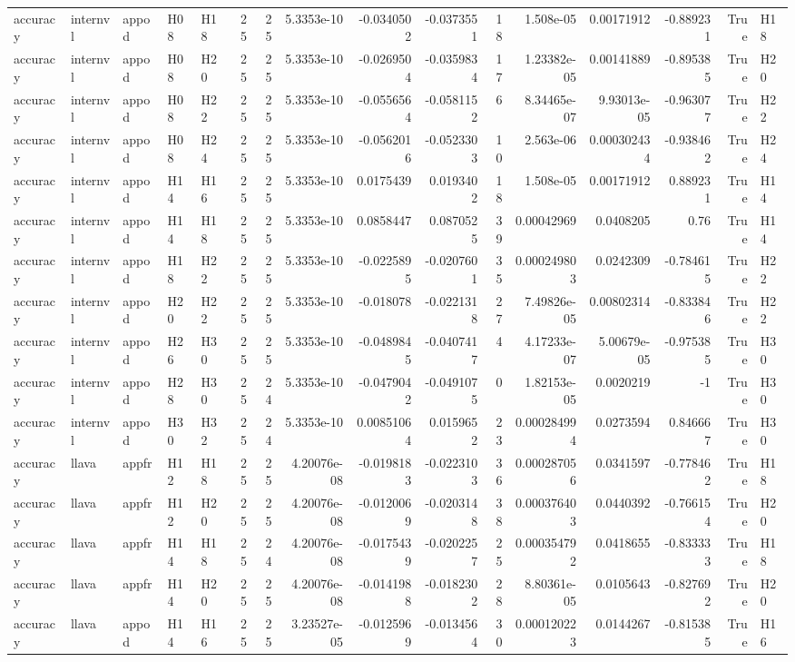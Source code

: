 \begin{longtable}{lllllrrrrrrrrrrl}
accuracy & internvl & appod & H08 & H18 & 25 & 25 & 5.3353e-10 & -0.0340502 & -0.0373551 & 18 & 1.508e-05 & 0.00171912 & -0.889231 & True & H18 \\
accuracy & internvl & appod & H08 & H20 & 25 & 25 & 5.3353e-10 & -0.0269504 & -0.0359834 & 17 & 1.23382e-05 & 0.00141889 & -0.895385 & True & H20 \\
accuracy & internvl & appod & H08 & H22 & 25 & 25 & 5.3353e-10 & -0.0556564 & -0.0581152 & 6 & 8.34465e-07 & 9.93013e-05 & -0.963077 & True & H22 \\
accuracy & internvl & appod & H08 & H24 & 25 & 25 & 5.3353e-10 & -0.0562016 & -0.0523303 & 10 & 2.563e-06 & 0.000302434 & -0.938462 & True & H24 \\
accuracy & internvl & appod & H14 & H16 & 25 & 25 & 5.3353e-10 & 0.0175439 & 0.0193402 & 18 & 1.508e-05 & 0.00171912 & 0.889231 & True & H14 \\
accuracy & internvl & appod & H14 & H18 & 25 & 25 & 5.3353e-10 & 0.0858447 & 0.0870525 & 39 & 0.00042969 & 0.0408205 & 0.76 & True & H14 \\
accuracy & internvl & appod & H18 & H22 & 25 & 25 & 5.3353e-10 & -0.0225895 & -0.0207601 & 35 & 0.000249803 & 0.0242309 & -0.784615 & True & H22 \\
accuracy & internvl & appod & H20 & H22 & 25 & 25 & 5.3353e-10 & -0.018078 & -0.0221318 & 27 & 7.49826e-05 & 0.00802314 & -0.833846 & True & H22 \\
accuracy & internvl & appod & H26 & H30 & 25 & 25 & 5.3353e-10 & -0.0489845 & -0.0407417 & 4 & 4.17233e-07 & 5.00679e-05 & -0.975385 & True & H30 \\
accuracy & internvl & appod & H28 & H30 & 25 & 24 & 5.3353e-10 & -0.0479042 & -0.0491075 & 0 & 1.82153e-05 & 0.0020219 & -1 & True & H30 \\
accuracy & internvl & appod & H30 & H32 & 25 & 24 & 5.3353e-10 & 0.00851064 & 0.0159652 & 23 & 0.000284994 & 0.0273594 & 0.846667 & True & H30 \\
accuracy & llava & appfr & H12 & H18 & 25 & 25 & 4.20076e-08 & -0.0198183 & -0.0223103 & 36 & 0.000287056 & 0.0341597 & -0.778462 & True & H18 \\
accuracy & llava & appfr & H12 & H20 & 25 & 25 & 4.20076e-08 & -0.0120069 & -0.0203148 & 38 & 0.000376403 & 0.0440392 & -0.766154 & True & H20 \\
accuracy & llava & appfr & H14 & H18 & 25 & 24 & 4.20076e-08 & -0.0175439 & -0.0202257 & 25 & 0.000354792 & 0.0418655 & -0.833333 & True & H18 \\
accuracy & llava & appfr & H14 & H20 & 25 & 25 & 4.20076e-08 & -0.0141988 & -0.0182302 & 28 & 8.80361e-05 & 0.0105643 & -0.827692 & True & H20 \\
accuracy & llava & appod & H14 & H16 & 25 & 25 & 3.23527e-05 & -0.0125969 & -0.0134564 & 30 & 0.000120223 & 0.0144267 & -0.815385 & True & H16 \\
\end{longtable}

